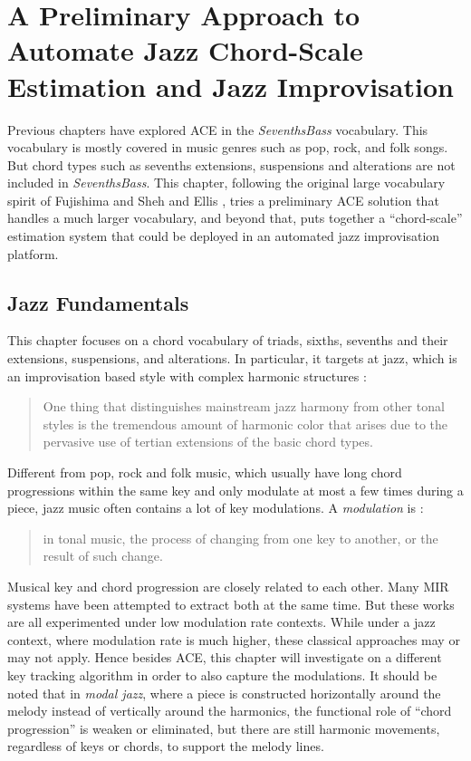 

\chapter{A Preliminary Approach to Automate Jazz Chord-Scale Estimation and Jazz Improvisation}\label{cp:jazz} %

Previous chapters have explored ACE in the \textit{SeventhsBass} vocabulary. This vocabulary is mostly covered in music genres such as pop, rock, and folk songs. But chord types such as sevenths extensions, suspensions and alterations are not included in \textit{SeventhsBass}. This chapter, following the original large vocabulary spirit of Fujishima \cite{fujishima1999realtime} and Sheh and Ellis \cite{sheh2003chord}, tries a preliminary ACE solution that handles a much larger vocabulary, and beyond that, puts together a ``chord-scale'' estimation system that could be deployed in an automated jazz improvisation platform.

\section{Jazz Fundamentals} \label{sec:5-jazzfund}
This chapter focuses on a chord vocabulary of triads, sixths, sevenths and their extensions, suspensions, and alterations. In particular, it targets at jazz, which is an improvisation based style with complex harmonic structures \cite{hojnackijazz}:
\begin{quote}
One thing that distinguishes mainstream jazz harmony from other tonal styles is the tremendous amount of harmonic color that arises due to the pervasive use of tertian extensions of the basic chord types.
\end{quote}
Different from pop, rock and folk music, which usually have long chord progressions within the same key and only modulate at most a few times during a piece, jazz music often contains a lot of key modulations. A {\it modulation} is \cite{randel1999harvard}:
\begin{quote}
in tonal music, the process of changing from one key to another, or the result of such change.
\end{quote}
Musical key and chord progression are closely related to each other. Many MIR systems \cite{catteau2007probabilistic,noland2009influences,mauch2010simultaneous,papadopoulos2012modeling} have been attempted to extract both at the same time. But these works are all experimented under low modulation rate contexts. While under a jazz context, where modulation rate is much higher, these classical approaches may or may not apply. Hence besides ACE, this chapter will investigate on a different key tracking algorithm in order to also capture the modulations. It should be noted that in {\it modal jazz}, where a piece is constructed horizontally around the melody instead of vertically around the harmonics, the functional role of ``chord progression'' is weaken or eliminated, but there are still harmonic movements, regardless of keys or chords, to support the melody lines.

